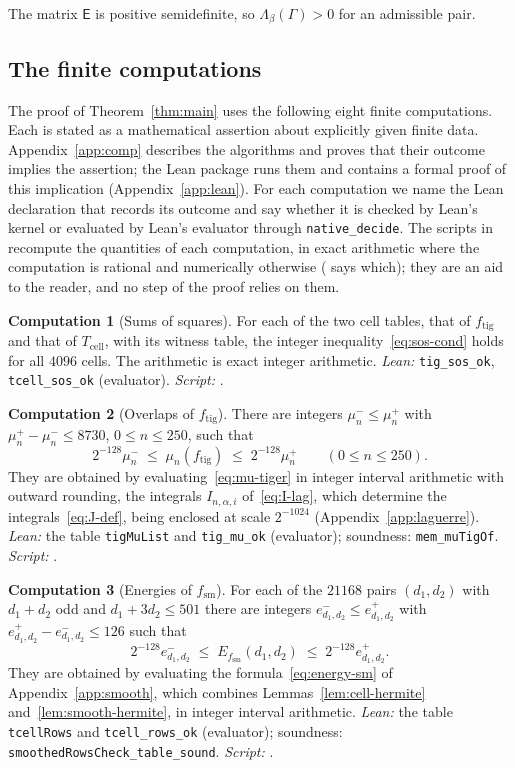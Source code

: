 \documentclass[11pt,reqno]{amsart}
\theoremstyle{definition}
\newtheorem{computation}{Computation}
\numberwithin{equation}{section}
\newcommand{\sE}{\mathsf{E}}
\newcommand{\Tcell}{T_{\mathrm{cell}}}
\newcommand{\ftig}{f_{\mathrm{tig}}}
\newcommand{\fsm}{f_{\mathrm{sm}}}
\begin{document}
The matrix $\sE$ is positive semidefinite, so $\Lambda_\beta(\Gamma)>0$ for an admissible pair.

\subsection{The finite computations}\label{sec:computations}
The proof of Theorem~\ref{thm:main} uses the following eight finite computations. Each is stated as a mathematical assertion about explicitly given finite data. Appendix~\ref{app:comp} describes the algorithms and proves that their outcome implies the assertion; the Lean package runs them and contains a formal proof of this implication (Appendix~\ref{app:lean}). For each computation we name the Lean declaration that records its outcome and say whether it is checked by Lean's kernel or evaluated by Lean's evaluator through \texttt{native\_decide}. The scripts in  recompute the quantities of each computation, in exact arithmetic where the computation is rational and numerically otherwise ( says which); they are an aid to the reader, and no step of the proof relies on them.

\begin{computation}[Sums of squares]\label{comp:sos}
For each of the two cell tables, that of $\ftig$ and that of $\Tcell$, with its witness table, the integer inequality~\eqref{eq:sos-cond} holds for all $4096$ cells. The arithmetic is exact integer arithmetic. \emph{Lean:} \texttt{tig\_sos\_ok}, \texttt{tcell\_sos\_ok} (evaluator). \emph{Script:} .
\end{computation}

\begin{computation}[Overlaps of $\ftig$]\label{comp:mu}
There are integers $\mu_n^-\le\mu_n^+$ with $\mu_n^+-\mu_n^-\le8730$, $0\le n\le250$, such that
\[
  2^{-128}\mu_n^-\;\le\;\mu_n(\ftig)\;\le\;2^{-128}\mu_n^+\qquad(0\le n\le250).
\]
They are obtained by evaluating~\eqref{eq:mu-tiger} in integer interval arithmetic with outward rounding, the integrals $I_{n,\alpha,i}$ of~\eqref{eq:I-lag}, which determine the integrals~\eqref{eq:J-def}, being enclosed at scale $2^{-1024}$ (Appendix~\ref{app:laguerre}). \emph{Lean:} the table \texttt{tigMuList} and \texttt{tig\_mu\_ok} (evaluator); soundness: \texttt{mem\_muTigOf}. \emph{Script:} .
\end{computation}

\begin{computation}[Energies of $\fsm$]\label{comp:energies}
For each of the $21168$ pairs $(d_1,d_2)$ with $d_1+d_2$ odd and $d_1+3d_2\le501$ there are integers $e^-_{d_1,d_2}\le e^+_{d_1,d_2}$ with $e^+_{d_1,d_2}-e^-_{d_1,d_2}\le126$ such that
\[
  2^{-128}e^-_{d_1,d_2}\;\le\;E_{\fsm}(d_1,d_2)\;\le\;2^{-128}e^+_{d_1,d_2}.
\]
They are obtained by evaluating the formula~\eqref{eq:energy-sm} of Appendix~\ref{app:smooth}, which combines Lemmas~\ref{lem:cell-hermite} and~\ref{lem:smooth-hermite}, in integer interval arithmetic. \emph{Lean:} the table \texttt{tcellRows} and \texttt{tcell\_rows\_ok} (evaluator); soundness: \texttt{smoothedRowsCheck\_table\_sound}. \emph{Script:} .
\end{computation}
\end{document}
